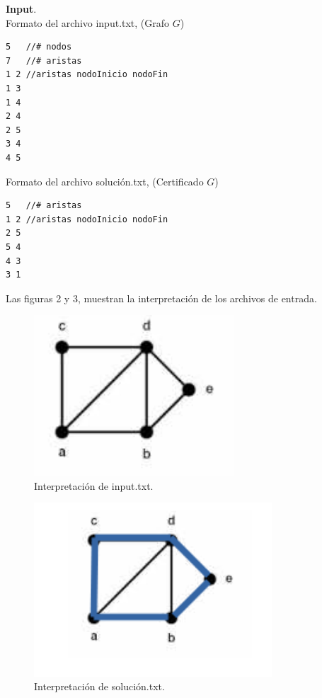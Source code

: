 \documentclass[12pt]{report}
\begin{document}
	\textbf{Input}.\\
Formato del archivo input.txt, (Grafo $G$)	
\lstset{language=c, breaklines=true, basicstyle=\footnotesize}
\lstset{numbers=left, numberstyle=\tiny, stepnumber=1, numbersep=10pt}
\begin{lstlisting}
5	//# nodos
7	//# aristas
1 2	//aristas nodoInicio nodoFin
1 3
1 4
2 4
2 5
3 4
4 5
\end{lstlisting}
Formato del archivo solución.txt, (Certificado $G$)	
\lstset{language=c, breaklines=true, basicstyle=\footnotesize}
\lstset{numbers=left, numberstyle=\tiny, stepnumber=1, numbersep=10pt}
\begin{lstlisting}
5	//# aristas
1 2	//aristas nodoInicio nodoFin
2 5
5 4
4 3
3 1
\end{lstlisting}
\newpage

Las figuras 2 y 3, muestran la interpretación de los archivos de entrada.

	\begin{figure}[H]
		\includegraphics[height=6cm]{imagenes/2.png}
		\centering
		\caption{Interpretación de input.txt.}
		\centering
	\end{figure}
	
	\begin{figure}[H]
		\includegraphics[height=6.5cm]{imagenes/3.png}
		\centering
		\caption{Interpretación de solución.txt.}
		\centering
	\end{figure}
	
\end{document}
